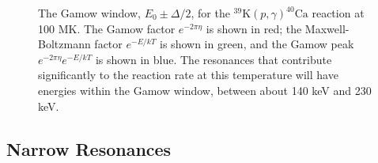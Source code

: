 \begin{figure}[t]
\caption{\label{fig:Gamow_Window}The Gamow window, $E_{0} \pm \Delta/2$, for the $^{39}\mathrm{K}(p,\gamma)^{40}\mathrm{Ca}$ reaction at 100 MK. The Gamow factor $e^{-2 \pi \eta}$ is shown in red; the Maxwell-Boltzmann factor $e^{-E/kT}$ is shown in green, and the Gamow peak $e^{-2 \pi \eta} e^{-E/kT}$ is shown in blue. The resonances that contribute significantly to the reaction rate at this temperature will have energies within the Gamow window, between about 140 keV and 230 keV.}
\end{figure}

\subsection{Narrow Resonances} \label{subsec:narrow_resonances}

